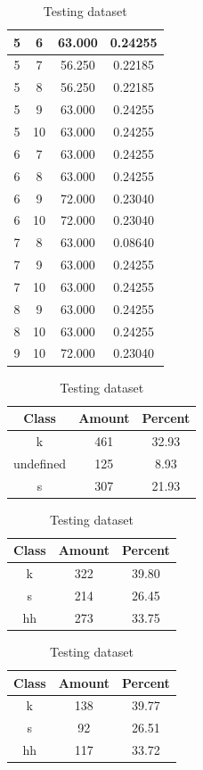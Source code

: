 \begin{table}
\begin{subtable}[tbp]{0.45\textwidth}
{\begin{tabular}{|c|c|c|c|}
 5 & 6 & 63.000 & 0.24255\\ \hline 
 5 & 7 & 56.250 & 0.22185\\ \hline 
 5 & 8 & 56.250 & 0.22185\\ \hline 
 5 & 9 & 63.000 & 0.24255\\ \hline 
 5 & 10 & 63.000 & 0.24255\\ \hline 
 6 & 7 & 63.000 & 0.24255\\ \hline 
 6 & 8 & 63.000 & 0.24255\\ \hline 
 6 & 9 & 72.000 & 0.23040\\ \hline 
 6 & 10 & 72.000 & 0.23040\\ \hline 
 7 & 8 & 63.000 & 0.08640\\ \hline 
 7 & 9 & 63.000 & 0.24255\\ \hline 
 7 & 10 & 63.000 & 0.24255\\ \hline 
 8 & 9 & 63.000 & 0.24255\\ \hline 
 8 & 10 & 63.000 & 0.24255\\ \hline 
 9 & 10 & 72.000 & 0.23040\\ \hline 

\end{tabular}
} \label{xlsskew2010}
\caption{xcsskew2010}
\end{subtable}

\begin{subtable}[tbp]{0.45\textwidth}
\centering
\begin{tabular}{|c|c|c|}
\hline
Class & Amount & Percent\\ \hline
k & 461 & 32.93\\ \hline
undefined & 125 & 8.93\\ \hline
s & 307 & 21.93\\ \hline
\end{tabular}
\caption{Entire dataset after stripping short sounds}
\end{subtable}
\hfill
\begin{subtable}[tbp]{0.45\textwidth}
\centering
\begin{tabular}{|c|c|c|}
\hline
Class & Amount & Percent\\ \hline
k & 322 & 39.80\\ \hline
s & 214 & 26.45\\ \hline
hh & 273 & 33.75\\ \hline
\end{tabular}
\caption{Training dataset}
\end{subtable}
\hfill
\begin{subtable}[tbp]{0.45\textwidth}
\centering
\begin{tabular}{|c|c|c|}
\hline
Class & Amount & Percent\\ \hline
k & 138 & 39.77\\ \hline
s & 92 & 26.51\\ \hline
hh & 117 & 33.72\\ \hline
\end{tabular}
\caption{Testing dataset}
\end{subtable}
\hfill


\end{table}

